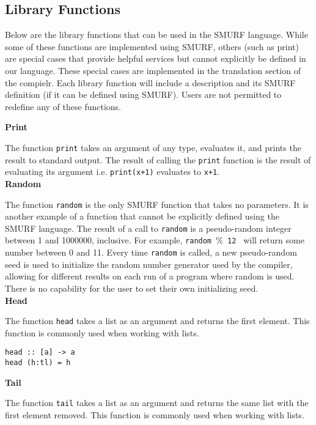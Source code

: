 \subsection{Library Functions}

Below are the library functions that can be used in the SMURF language. 
While some of these functions are implemented using SMURF, others (such as print) are special cases that provide
helpful services but cannot explicitly be defined in our language. These special cases are implemented in the translation
section of the compielr. Each library function will include a description 
and its SMURF definition (if it can be defined using SMURF). Users are not permitted to redefine any of these functions. \newline

\noindent\textbf{Print}

The function \texttt{print} takes an argument of any type, evaluates it, and prints the result to standard output.
The result of calling the \texttt{print}
function is the result of evaluating its argument i.e. \texttt{print(x+1)} evaluates to \texttt{x+1}.\\

\noindent\textbf{Random}
\label{sec:random}

The function \texttt{random} is the only SMURF function that takes no parameters. It is another example of a function that cannot
be explicitly defined using the SMURF language. The result of a call to \texttt{random} is a pseudo-random integer between 1 and 1000000, inclusive.
For example, \texttt{random $\%$ 12 } will return some number between 0 and 11.
Every time \texttt{random} is called, a new pseudo-random seed is used to initialize the random number generator used by the compiler, allowing for
different results on each run of a program where random is used. There is no capability for the user to set their own initializing seed. \\

\noindent\textbf{Head}

The function \texttt{head} takes a list as an argument and returns the first element. 
This function is commonly used when working with lists.

\begin{verbatim}
head :: [a] -> a
head (h:tl) = h
\end{verbatim} 


\noindent\textbf{Tail}

The function \texttt{tail} takes a list as an argument and returns the same list with
the first element removed.
This function is commonly used when working with lists. 

